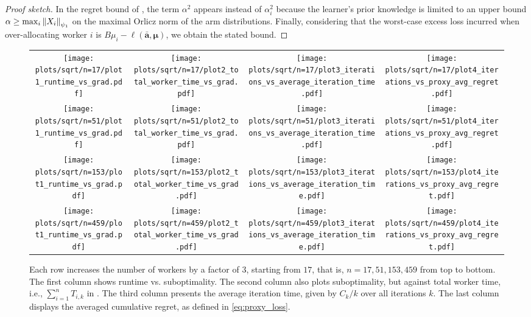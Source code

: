 \begin{proof}[Proof sketch]
In the regret bound of , the term $\alpha^2$ appears instead of $\alpha_i^2$ because the learner's prior knowledge is limited to an upper bound $\alpha \ge \max_i \left\| X_i \right\|_{\psi_1}$ on the maximal Orlicz norm of the arm distributions.
Finally, considering that the worst-case excess loss incurred when over-allocating worker $i$ is $B\mu_i - \ell(\bar{\bm{a}}, \bm{\mu})$, we obtain the stated bound.
\end{proof}


\begin{figure*}[t]
    \centering
    \begin{tabular}{cccc}
        \texttt{[image: plots/sqrt/n=17/plot1\_runtime\_vs\_grad.pdf]} &
        \texttt{[image: plots/sqrt/n=17/plot2\_total\_worker\_time\_vs\_grad.pdf]} &
        \texttt{[image: plots/sqrt/n=17/plot3\_iterations\_vs\_average\_iteration\_time.pdf]} &
        \texttt{[image: plots/sqrt/n=17/plot4\_iterations\_vs\_proxy\_avg\_regret.pdf]} \\
        \texttt{[image: plots/sqrt/n=51/plot1\_runtime\_vs\_grad.pdf]} &
        \texttt{[image: plots/sqrt/n=51/plot2\_total\_worker\_time\_vs\_grad.pdf]} &
        \texttt{[image: plots/sqrt/n=51/plot3\_iterations\_vs\_average\_iteration\_time.pdf]} &
        \texttt{[image: plots/sqrt/n=51/plot4\_iterations\_vs\_proxy\_avg\_regret.pdf]} \\
        \texttt{[image: plots/sqrt/n=153/plot1\_runtime\_vs\_grad.pdf]} &
        \texttt{[image: plots/sqrt/n=153/plot2\_total\_worker\_time\_vs\_grad.pdf]} &
        \texttt{[image: plots/sqrt/n=153/plot3\_iterations\_vs\_average\_iteration\_time.pdf]} &
        \texttt{[image: plots/sqrt/n=153/plot4\_iterations\_vs\_proxy\_avg\_regret.pdf]} \\
        \texttt{[image: plots/sqrt/n=459/plot1\_runtime\_vs\_grad.pdf]} &
        \texttt{[image: plots/sqrt/n=459/plot2\_total\_worker\_time\_vs\_grad.pdf]} &
        \texttt{[image: plots/sqrt/n=459/plot3\_iterations\_vs\_average\_iteration\_time.pdf]} &
        \texttt{[image: plots/sqrt/n=459/plot4\_iterations\_vs\_proxy\_avg\_regret.pdf]} \\
    \end{tabular}
    \caption{
        Each row increases the number of workers by a factor of 3, starting from $17$, that is, $n = 17, 51, 153, 459$ from top to bottom.
        The first column shows runtime vs. suboptimality.  
        The second column also plots suboptimality, but against total worker time, i.e., $\sum_{i=1}^n T_{i,k}$ in .
        The third column presents the average iteration time, given by $C_k / k$ over all iterations $k$.  
        The last column displays the averaged cumulative regret, as defined in \eqref{eq:proxy_loss}.
    }
    \label{fig:sqrt}
\end{figure*}

